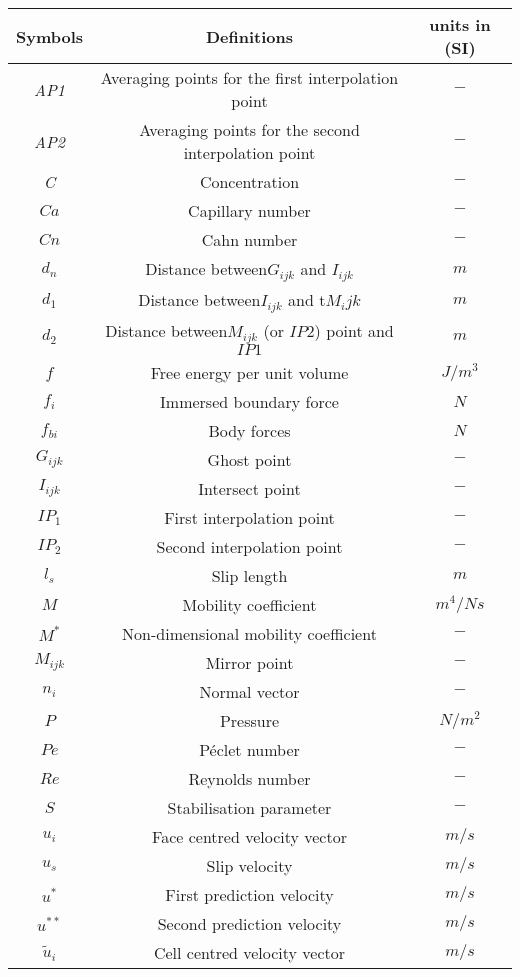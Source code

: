 \documentclass[review]{elsarticle}
\begin{document}
\begin{center}
\begin{longtable}{ c  c c }
  Symbols & Definitions & units in (SI) \\
\hline
\it{AP1}&Averaging points for the first interpolation point&$-$\\ 
\it{AP2}&Averaging points for the second interpolation point&$-$\\ 
\it{C}& Concentration&$-$\\ 
\it{$Ca$}&Capillary number&$-$\\  
\it{$Cn$}& Cahn number&$-$\\     
\it{$d_n$}&Distance between$G_{ijk}$ and $I_{ijk}$&$m$\\  
\it{$d_1$}&Distance between$I_{ijk}$ and t$M_ijk$&$m$\\  
\it{$d_2$}&Distance between$M_{ijk}$ (or $IP2$) point and $IP1$&$m$\\    
\it{$f$}&Free energy per unit volume&$J/m^3$\\
\it{$f_i$}&Immersed boundary force&$N$\\  
\it{$f_{bi}$}&Body forces&$N$\\  
\it{$G_{ijk}$}&Ghost point&$-$\\ 
\it{$I_{ijk}$}&Intersect point&$-$\\    
\it{$IP_{1}$}&First interpolation point&$-$\\ 
\it{$IP_{2}$}&Second interpolation point&$-$\\ 
\it{$l_s$}&Slip length&$m$\\
\it{$M$}&Mobility coefficient&$m^4/Ns$\\
\it{$M^*$}&Non-dimensional mobility coefficient&$-$\\  
\it{$M_{ijk}$}&Mirror point&$-$\\ 
\it{$n_i$}&Normal vector&$-$\\   
\it{$P$}&Pressure&$N/m^2$\\
\it{$Pe$}&P\'{e}clet number&$-$\\   
\it{$Re$}&Reynolds number&$-$\\  
\it{$S$}&Stabilisation parameter&$-$\\    
\it{$u_i$}&Face centred velocity vector&$m/s$\\
\it{$u_s$}&Slip velocity&$m/s$\\
\it{$u^*$}&First prediction velocity&$m/s$\\
\it{$u^{**}$}&Second prediction velocity&$m/s$\\    
\it{$\tilde{u}_i$}&Cell centred velocity vector&$m/s$\\

\end{longtable}
\end{center}
\end{document}
